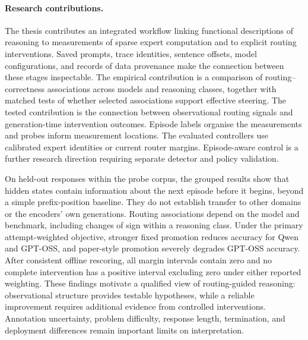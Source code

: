 \documentclass[12pt,a4paper,twoside,openright]{book}
\begin{document}
\paragraph{Research contributions.}
The thesis contributes an integrated workflow linking functional descriptions
of reasoning to measurements of sparse expert computation and to explicit
routing interventions. Saved prompts, trace identities, sentence offsets,
model configurations, and records of data provenance make the connection between
these stages inspectable. The empirical contribution is a comparison of
routing--correctness associations across models and reasoning classes,
together with matched tests of whether selected associations support
effective steering. The tested contribution is the connection between
observational routing signals and generation-time intervention outcomes.
Episode labels organise the measurements and probes inform measurement
locations. The evaluated controllers use calibrated expert identities or
current router margins. Episode-aware control is a further research direction
requiring separate detector and policy validation.

On held-out responses within the probe corpus, the grouped results show that
hidden states contain information about the next episode before it begins,
beyond a simple prefix-position baseline.
They do not establish transfer to other domains or the encoders' own generations. Routing associations depend on the model and benchmark,
including changes of sign within a reasoning class. Under the primary
attempt-weighted objective, stronger fixed promotion reduces accuracy
for Qwen and GPT-OSS, and paper-style promotion severely degrades GPT-OSS
accuracy. After consistent offline rescoring, all margin intervals contain
zero and no complete intervention has a positive interval excluding zero
under either reported weighting. These findings motivate a
qualified view of routing-guided reasoning: observational structure provides
testable hypotheses, while a reliable improvement requires additional
evidence from controlled interventions. Annotation uncertainty, problem
difficulty, response length, termination, and deployment differences remain
important limits on interpretation.
\end{document}
